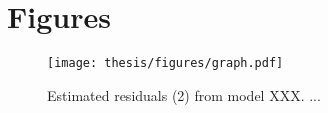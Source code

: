 
\section{Figures}\label{App:Figures}

\begin{figure}[ht]
    \begin{center}
        \texttt{[image: thesis/figures/graph.pdf]}
        \caption{Estimated residuals (2) from model XXX. ...}
        \label{Fig:Resids2}
    \end{center}
\end{figure}
